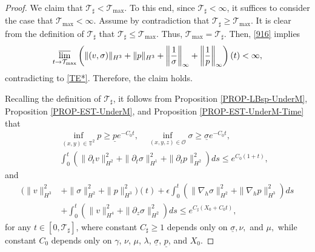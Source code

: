 \documentclass[12pt,reqno]{amsart}
\numberwithin{equation}{section}
\begin{document}
\begin{proof}
We claim that $\mathcal T_\sharp<\mathcal T_\text{max}$. To this end, since $\mathcal T_\sharp<\infty$, it suffices to consider the case that
$\mathcal T_\text{max}<\infty$. Assume by contradiction that $\mathcal T_\sharp\geq\mathcal T_\text{max}$.
It is clear from the definition of $\mathcal T_\sharp$ that $\mathcal T_\sharp\leq\mathcal T_\text{max}$.
Thus, $\mathcal T_\text{max}=\mathcal T_\sharp$. Then, \eqref{916} implies
\begin{equation*}
  \varlimsup_{t\rightarrow\mathcal T_\text{max}}\left(\|(v,\sigma)\|_{H^3}+\|p\|_{H^3}+\left\|\frac1\sigma\right\|_\infty+
  \left\|\frac1p\right\|_\infty\right)(t)<\infty,
\end{equation*}
contradicting to \eqref{TE*}. Therefore, the claim holds.

Recalling the definition of $\mathcal T_\sharp$, it follows from
Proposition \ref{PROP-LBsp-UnderM}, Proposition \ref{PROP-EST-UnderM}, and Proposition \ref{PROP-EST-UnderM-Time} that
\begin{eqnarray}
&&\inf_{(x,y)\in\mathbb T^2}p\geq\underline pe^{-C_0t},\quad \inf_{(x,y,z)\in\mathcal O}\sigma \geq\underline\sigma e^{-C_0t}, \label{LBsp}\\
&&\int_0^t(\|\partial_tv\|_{H^2}^2+\|\partial_t\sigma\|_{H^1}^2+\|\partial_tp\|_{H^2}^2)ds\leq e^{C_0(1+t)},\label{APRESTTIME}
\end{eqnarray}
and
\begin{align}
(\|v\|_{H^3}^2&+\|\sigma\|_{H^2}^2+\|p\|_{H^3}^2)(t)+\epsilon\int_0^t(\|\nabla_h\sigma\|_{H^2}^2+\|\nabla_hp\|_{H^3}^2)ds\nonumber\\
  &+\int_0^t(\|v\|_{H^4}^2+\|\partial_z\sigma\|_{H^2}^2)ds \leq e^{C_\sharp(X_0+C_0t) },\label{Hkvsp}
\end{align}
for any $t\in[0,\mathcal T_\sharp]$,
where constant $C_\sharp\geq1$ depends only on $\underline\sigma, \nu,$ and $\mu,$ while constant $C_0$ depends only on $\gamma$, $\nu$, $\mu$,
$\lambda$, $\underline\sigma$, $\underline p$, and $X_0$.


\end{proof}
\end{document}
